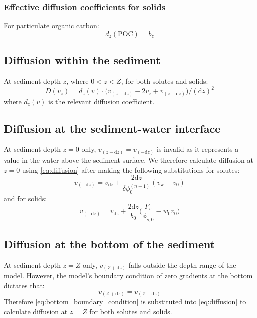 \documentclass[a4paper]{article}
\newcommand{\D}[1]{\mathrm{d}#1}
\begin{document}
\subsubsection{Effective diffusion coefficients for solids}

For particulate organic carbon:
\begin{equation}
d_z(\mathrm{POC}) = b_z
\end{equation}

\subsection{Diffusion within the sediment}

At sediment depth $z$, where $0 < z < Z$, for both solutes and solids:
\begin{equation}\label{eq:diffusion}
D(v_z) = d_z(v) \cdot \big( v_{(z-\D{z})} - 2 v_z + v_{(z+\D{z})} \big) / (\D{z})^2
\end{equation}
where $d_z(v)$ is the relevant diffusion coefficient.

\subsection{Diffusion at the sediment-water interface}\label{sx:diffusion_surface}

At sediment depth $z = 0$ only, $v_{(z-\D{z})} = v_{(-\D{z})}$ is invalid as it represents a value in the water above the sediment surface. We therefore calculate diffusion at $z = 0$ using \eqref{eq:diffusion} after making the following substitutions for solutes:
\begin{equation}\label{Dv0}
v_{(-\D{z})} = v_{\D{z}} + \frac{2 \D{z}}{\delta \phi_0^{(n+1)}} (v_\mathrm{w} - v_0)
\end{equation}
and for solids:
\begin{equation}
v_{(-\D{z})} = v_{\D{z}} + \frac{2 \D{z}}{b_0} \Bigg( \frac{F_v}{\phi_{s, 0}} - w_0 v_0 \Bigg)
\end{equation}

\subsection{Diffusion at the bottom of the sediment}\label{sx:diffusion_bottom}

At sediment depth $z = Z$ only, $v_{(Z+\D{z})}$ falls outside the depth range of the model. However, the model's boundary condition of zero gradients at the bottom dictates that:
\begin{equation}\label{eq:bottom_boundary_condition}
v_{(Z+\D{z})} = v_{(Z-\D{z})}
\end{equation}
Therefore \eqref{eq:bottom_boundary_condition} is substituted into \eqref{eq:diffusion} to calculate diffusion at $z = Z$ for both solutes and solids.
\end{document}
